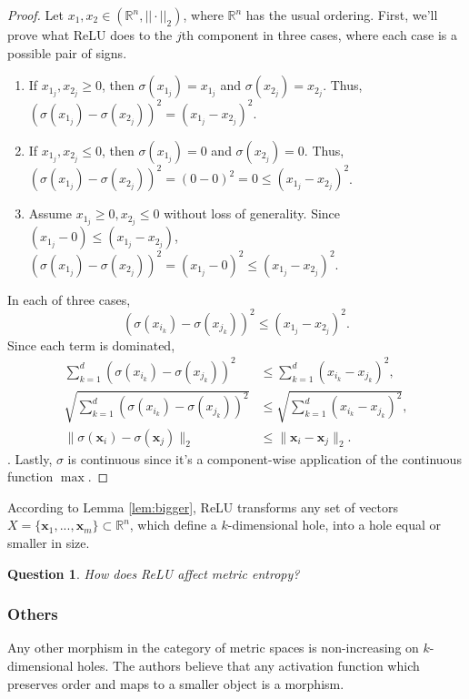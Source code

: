 \documentclass{article}
\newtheorem{question}{Question}
\newcommand{\R}{\mathbb{R}}
\newcommand{\ltwo}[1]{\lVert {#1} \rVert_2}
\newcommand{\x}{\mathbf{x}}
\newcommand{\relu}{\sigma}
\begin{document}
\begin{proof}
Let $x_1,x_2\in (\R^n,||\cdot||_2)$, where $\R^n$ has the usual ordering.
First, we'll prove what ReLU does to the $j$th component in three cases, where each case is a possible pair of signs.

\begin{enumerate}
    \item If $x_{1_j},x_{2_j}\ge0$, then $\sigma(x_{1_j})=x_{1_j}$ and $\sigma(x_{2_j}) = x_{2_j}$. Thus, $(\sigma(x_{1_j})-\sigma(x_{2_j}))^2 = (x_{1_j}-x_{2_j})^2$.
    \item If $x_{1_j},x_{2_j}\le0$, then $\sigma(x_{1_j})=0$ and $\sigma(x_{2_j})=0$. Thus, $(\sigma(x_{1_j})-\sigma(x_{2_j}))^2=(0-0)^2=0\le (x_{1_j}-x_{2_j})^2$.
    \item Assume $x_{1_j}\ge 0, x_{2_j}\le0$ without loss of generality. 
     Since $(x_{1_j}-0)\le (x_{1_j}-x_{2_j})$, $(\sigma(x_{1_j})-\sigma(x_{2_j}))^2=(x_{1_j}-0)^2 \le (x_{1_j}-x_{2_j})^2$.
\end{enumerate}
In each of three cases,
\[
(\sigma(x_{i_k})-\sigma(x_{j_k}))^2 \le (x_{1_j}-x_{2_j})^2.
\]
Since each term is dominated,
\begin{align*}
    \sum_{k=1}^d (\sigma(x_{i_k})-\sigma(x_{j_k}))^2 &\le \sum_{k=1}^d (x_{i_k}-x_{j_k})^2,\\
     \sqrt{\sum_{k=1}^d (\sigma(x_{i_k})-\sigma(x_{j_k}))^2} &\le \sqrt{\sum_{k=1}^d (x_{i_k}-x_{j_k})^2},\\
     \ltwo{\sigma(\x_i)-\sigma(\x_j)} &\le \ltwo{\x_i-\x_j}.
\end{align*}.
Lastly, $\relu$ is continuous since it's a component-wise application of the continuous function $\max$.
\end{proof}

According to Lemma \ref{lem:bigger}, ReLU transforms any set of vectors $X=\{\x_1,...,\x_m\}\subset \R^n$, which define a $k$-dimensional hole, into a hole equal or smaller in size.

\begin{question}
How does ReLU affect metric entropy?
\end{question}

\subsubsection{Others}
Any other morphism in the category of metric spaces is non-increasing on $k$-dimensional holes.
The authors believe that any activation function which preserves order and maps to a smaller object is a morphism.
\end{document}
